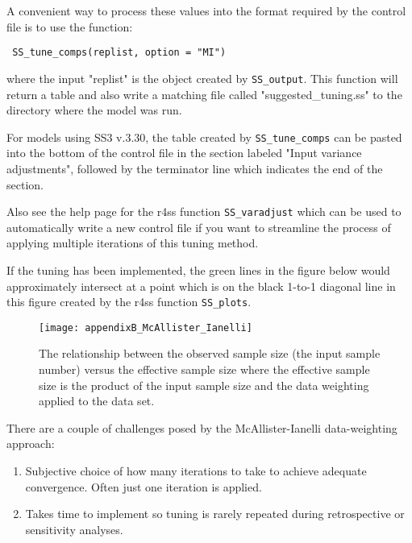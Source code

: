 A convenient way to process these values into the format required by the control file is to use the function:

\texttt{ SS\_tune\_comps(replist, option = "MI") }

where the input "replist" is the object created by \texttt{SS\_output}. This function will return a table and also write a matching file called "suggested\_tuning.ss" to the directory where the model was run.

For models using SS3 v.3.30, the table created by \texttt{SS\_tune\_comps} can be pasted into the bottom of the control file in the section labeled "Input variance adjustments", followed by the terminator line which indicates the end of the section. 


Also see the help page for the r4ss function \texttt{SS\_varadjust} which can be used to automatically write a new control file if you want to streamline the process of applying multiple iterations of this tuning method.

If the tuning has been implemented, the green lines in the figure below would approximately intersect at a point which is on the black 1-to-1 diagonal line in this figure created by the r4ss function \texttt{SS\_plots}.

\begin{figure}[h]
	\begin{center}
		\texttt{[image: appendixB\_McAllister\_Ianelli]}\\
	\end{center}

	\caption{ The relationship between the observed sample size (the input sample number) versus the effective sample size where the effective sample size is the product of the input sample size and the data weighting applied to the data set. }
	\label{(fig:mcallister)}
\end{figure}

There are a couple of challenges posed by the McAllister-Ianelli data-weighting approach:
\begin{enumerate}
	\item Subjective choice of how many iterations to take to achieve adequate convergence. Often just one iteration is applied.
	
	\item Takes time to implement so tuning is rarely repeated during retrospective or sensitivity analyses.
\end{enumerate}


